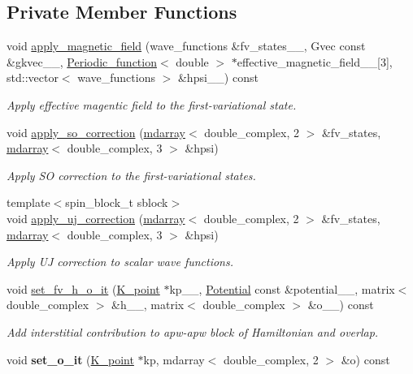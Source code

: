 \subsection*{Private Member Functions}
\begin{DoxyCompactItemize}
\item 
void \hyperlink{classsirius_1_1_band_abf2df1e8c97986110eed557241ffe09f}{apply\+\_\+magnetic\+\_\+field} (wave\+\_\+functions \&fv\+\_\+states\+\_\+\+\_\+, Gvec const \&gkvec\+\_\+\+\_\+, \hyperlink{classsirius_1_1_periodic__function}{Periodic\+\_\+function}$<$ double $>$ $\ast$effective\+\_\+magnetic\+\_\+field\+\_\+\+\_\+\mbox{[}3\mbox{]}, std\+::vector$<$ wave\+\_\+functions $>$ \&hpsi\+\_\+\+\_\+) const 
\begin{DoxyCompactList}\small\item\em Apply effective magentic field to the first-\/variational state. \end{DoxyCompactList}\item 
void \hyperlink{classsirius_1_1_band_a8465650f5a337f7473c499a11092efb7}{apply\+\_\+so\+\_\+correction} (\hyperlink{classsddk_1_1mdarray}{mdarray}$<$ double\+\_\+complex, 2 $>$ \&fv\+\_\+states, \hyperlink{classsddk_1_1mdarray}{mdarray}$<$ double\+\_\+complex, 3 $>$ \&hpsi)
\begin{DoxyCompactList}\small\item\em Apply S\+O correction to the first-\/variational states. \end{DoxyCompactList}\item 
{\footnotesize template$<$spin\+\_\+block\+\_\+t sblock$>$ }\\void \hyperlink{classsirius_1_1_band_abe0170064dcfd89b4073fa04772a41b2}{apply\+\_\+uj\+\_\+correction} (\hyperlink{classsddk_1_1mdarray}{mdarray}$<$ double\+\_\+complex, 2 $>$ \&fv\+\_\+states, \hyperlink{classsddk_1_1mdarray}{mdarray}$<$ double\+\_\+complex, 3 $>$ \&hpsi)
\begin{DoxyCompactList}\small\item\em Apply U\+J correction to scalar wave functions. \end{DoxyCompactList}\item 
void \hyperlink{classsirius_1_1_band_a383b6f157ed167d5f338c189b299810b}{set\+\_\+fv\+\_\+h\+\_\+o\+\_\+it} (\hyperlink{classsirius_1_1_k__point}{K\+\_\+point} $\ast$kp\+\_\+\+\_\+, \hyperlink{classsirius_1_1_potential}{Potential} const \&potential\+\_\+\+\_\+, matrix$<$ double\+\_\+complex $>$ \&h\+\_\+\+\_\+, matrix$<$ double\+\_\+complex $>$ \&o\+\_\+\+\_\+) const 
\begin{DoxyCompactList}\small\item\em Add interstitial contribution to apw-\/apw block of Hamiltonian and overlap. \end{DoxyCompactList}\item 
\hypertarget{classsirius_1_1_band_a599e89becda7a83ecc341e27c869969f}{}void {\bfseries set\+\_\+o\+\_\+it} (\hyperlink{classsirius_1_1_k__point}{K\+\_\+point} $\ast$kp, mdarray$<$ double\+\_\+complex, 2 $>$ \&o) const \label{classsirius_1_1_band_a599e89becda7a83ecc341e27c869969f}


\end{DoxyCompactItemize}
